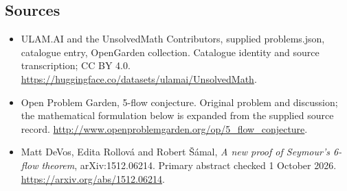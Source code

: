 \documentclass[11pt,a4paper]{article}
\begin{document}
\subsection{Sources}
\begin{itemize}
\item[S1] ULAM.AI and the UnsolvedMath Contributors, supplied problems.json, catalogue entry, OpenGarden collection. Catalogue identity and source transcription; CC BY 4.0.
\url{https://huggingface.co/datasets/ulamai/UnsolvedMath}.
\item[S2] Open Problem Garden, 5-flow conjecture. Original problem and discussion; the mathematical formulation below is expanded from the supplied source record.
\url{http://www.openproblemgarden.org/op/5_flow_conjecture}.
\item[R1] Matt DeVos, Edita Rollová and Robert Šámal,
\emph{A new proof of Seymour's 6-flow theorem}, arXiv:1512.06214.
Primary abstract checked 1 October 2026.
\url{https://arxiv.org/abs/1512.06214}.
\end{itemize}
\end{document}

